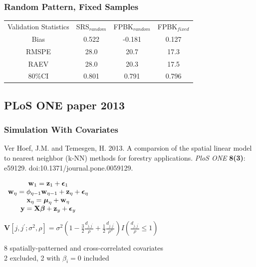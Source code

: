 \documentclass[mathserif,compress]{beamer}\usepackage{graphicx, color}
\def\bw{\mathbf{w}}
\def\bx{\mathbf{x}}
\def\by{\mathbf{y}}
\def\bz{\mathbf{z}}
\def\bV{\mathbf{V}}
\def\bX{\mathbf{X}}
\def\bbeta{\mbox{\boldmath $\beta$}}
\def\bepsilon{\mbox{\boldmath $\epsilon$}}
\def\bmu{\mbox{\boldmath $\mu$}}
\def\upp{^\prime}
\newcommand{\cre}[1]{\color{red!70!black}#1}
\newcommand{\cbl}[1]{\color{blue!70!black}#1}
\begin{document}

\begin{frame}[fragile]
\frametitle{Random Pattern, Fixed Samples}

\footnotesize
	\begin{table}[ht]
	\centering
	\begin{tabular}{cccc}
	Validation Statistics & SRS$_{random}$ & FPBK$_{random}$ & FPBK$_{fixed}$\\ 
	\cbl{Bias} & \cre{0.522} & \cre{-0.181} & \cre{0.127} \\ 
	\cbl{RMSPE} & \cre{28.0} & \cre{20.7} & \cre{17.3} \\ 
	\cbl{RAEV} & \cre{28.0} & \cre{20.3} & \cre{17.5} \\ 
	\cbl{80\%CI} & \cre{0.801} & \cre{0.791} & \cre{0.796}\\ 
	\end{tabular}
	\end{table}

\end{frame}


\subsection{PLoS ONE paper 2013}
\begin{frame}[fragile]
\frametitle{Simulation With Covariates}

\footnotesize
Ver Hoef, J.M.  and Temesgen, H.  2013. A comparsion of the spatial linear model to nearest neighbor (k-NN) methods for forestry applications.  {\it PloS ONE} {\bf 8(3)}: e59129. doi:10.1371/journal.pone.0059129.

\begin{table}
\centering
$
\begin{array}{c}
	\bw_1 = \bz_1 + \bepsilon_1 \\
	\bw_\eta = \phi_{\eta-1}\bw_{\eta-1} + \bz_\eta + \bepsilon_\eta \\
	\bx_\eta = \bmu_\eta + \bw_\eta \\
	\by = \bX\bbeta + \bz_y + \bepsilon_y \\
\end{array}
$
\end{table}
\begin{center}
$	\bV[j,j\upp;\sigma^2,\rho] =  
		\sigma^2\left(1-\frac{3}{2}\frac{d_{j,j\upp}}{\rho}+
		\frac{1}{2}\frac{d_{j,j\upp}}{\rho^3}\right)
		    I\left(\frac{d_{j,j\upp}}{\rho}\leq 1\right) 
$
\end{center}

8 spatially-patterned and cross-correlated covariates \\
2 excluded, 2 with $\beta_i = 0$ included

\end{frame}
\end{document}

